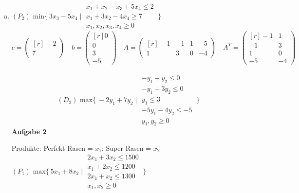 \documentclass[a4paper,10pt]{article}
\begin{document}
\begin{enumerate}[a)]
	\item 
	$(P_2) \text{ min} \{\ 3x_3 - 5x_4 \mid 
	\begin{matrix}
		x_1 + x_2 - x_3 + 5x_4 \leq 2\\
		x_1 + 3x_2 -4x_4 \geq 7\\
		x_1, x_2, x_3, x_4 \geq 0
	\end{matrix}
	\ \}$
	\\
	\[
	c = 
	\begin{pmatrix*}[r]
		-2\\
		7
	\end{pmatrix*}
	\quad
	b = 
	\begin{pmatrix*}[r]
		0\\
		0\\
		3\\
		-5
	\end{pmatrix*}
	\quad
	A =
	\begin{pmatrix*}[r]
		-1 & -1 & 1 & -5\\
		1 & 3 & 0 & -4
	\end{pmatrix*}
	\quad
	A^T = 
	\begin{pmatrix*}[r]
		-1 & 1\\
		-1 & 3\\
		1  & 0\\
		-5 & -4
	\end{pmatrix*}
	\]
	\ \\
	\[
	(D_2) \text{ max} \{\ -2y_1 + 7y_2 \mid 
	\begin{matrix}
		-y_1 + y_2 \leq 0\\
		-y_1 + 3y_2 \leq 0\\
		y_1 \leq 3\\
		-5y_1 - 4y_2 \leq -5\\
		y_1, y_2 \geq 0
	\end{matrix}
	\ \}
	\]
	\newpage	
	\textbf{Aufgabe 2}
	
	Produkte: Perfekt Rasen = $ x_1 $; Super Rasen = $ x_2 $\\
	
	$(P_1) \text{ max} \{\ 5x_1 + 8x_2 \mid \begin{matrix}
	2x_1 + 3x_2 \leq 1500\\
	x_1 + 2x_2 \leq 1200\\
	2x_1 + x_2 \leq 1300\\
	x_1, x_2 \geq 0
	\end{matrix}
	\ \}$\\\\
	

\end{enumerate}
\end{document}
